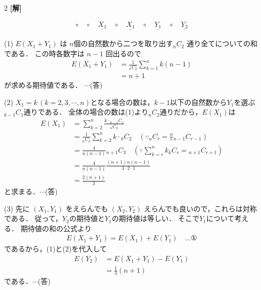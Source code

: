\documentclass[../../../../main.tex]{subfiles}
\begin{document}
\setcounter{equation}{0}
\begin{oframed}
  
\end{oframed}
\setlength{\columnseprule}{0.4pt}
\begin{multicols}{2}
  {\bf[解]}

  \begin{align*}
    \circ \quad \circ \quad \underline{X_1} \quad \circ \quad \underline{X_1} \quad \circ \quad \underline{Y_1} \quad \circ \quad \underline{Y_2}
  \end{align*}

  (1)
  $E(X_1+Y_1)$ は $n$個の自然数から二つを取り出す${}_n C_2$ 通り全てについての和である．
  この時各数字は $n-1$ 回出るので
  \begin{align*}
    E(X_1+Y_1)
     & = \frac{1}{{}_n C_2} \sum_{k=1}^n k(n-1) \\
     & = n+1
  \end{align*}
  が求める期待値である．  $\cdots$(答)

  \vspace{10pt}
  (2)
  $X_1=k\, (k=2,3,\cdots, n)$となる場合の数は，$k-1$以下の自然数から$Y_1$を選ぶ${}_{k-1}C_{1}$通りである．
  全体の場合の数は(1)より${}_n C_2$通りだから，$E(X_1)$は
  \begin{align*}
    E(X_1) & = \sum_{k=2}^{n} \frac{k \cdot {}_{k-1} C_1}{{}_n C_2}                                                      \\
           & = \frac{1}{{}_n C_2} \sum_{k=2}^n k \cdot {}_k C_2 \quad (\because {}_n C_r = \frac{n}{r} {}_{n-1} C_{r-1}) \\
           & = \frac{4}{n(n-1)} {}_{n+1} C_3 \quad (\because \sum_{k=r}^{n} k{}_k C_r = {}_{n+1} C_{r+1})                \\
           & = \frac{4}{n(n-1)} \frac{(n+1)n(n-1)}{3 \cdot 2 \cdot 1}                                                    \\
           & = \frac{2(n+1)}{3}
  \end{align*}
  と求まる．$\cdots$(答)

  \vspace{10pt}
  (3)
  先に $(X_1, Y_1)$ をえらんでも $(X_2, Y_2)$ えらんでも良いので，これらは対称である．
  従って，$Y_2$の期待値と$Y_1$の期待値は等しい．
  そこで$Y_1$について考える．
  期待値の和の公式より
  \begin{align*}
    E(X_1+Y_1) = E(X_1) + E(Y_1) \quad \dots \text{①}
  \end{align*}
  であるから，(1)と(2)を代入して
  \begin{align*}
    E(Y_2)
     & = E(X_1+Y_1)- E(Y_1) \\
     & = \frac{1}{3}(n+1)
  \end{align*}
  である．$\cdots$(答)


\end{multicols}
\end{document}
